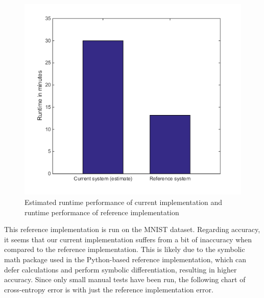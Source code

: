 \documentclass{sig-alternate}
\begin{document}
\begin{figure}[h]
	\begin{center}
		\includegraphics[width=1\linewidth]{performance.png}
	\end{center}
	\vspace{-12pt}
	\caption{Estimated runtime performance of current implementation and runtime performance of reference implementation}
	\label{fig:performance}
\end{figure}

This reference implementation is run on the MNIST dataset.
Regarding accuracy, it seems that our current implementation suffers from a bit of inaccuracy
when compared to the reference implementation. This is likely due to the symbolic math
package used in the Python-based reference implementation, which can defer calculations
and perform symbolic differentiation, resulting in higher accuracy. Since only
small manual tests have been run, the following chart of cross-entropy error is with just the
reference implementation error. 
\end{document}
